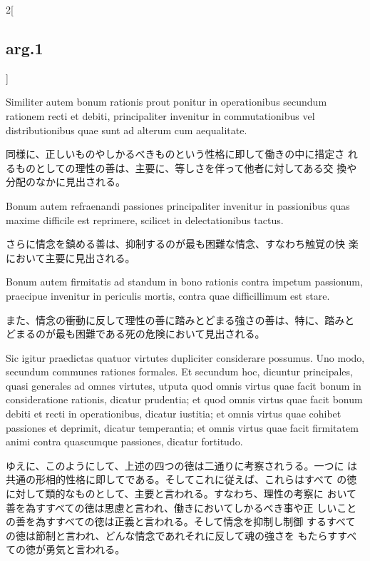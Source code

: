 \documentclass[paper=a4paper,fontsize=10pt,jafontsize=9pt,titlepage]{jlreq}
\begin{document}
\begin{paracol}{2}[\subsection{arg.1}]
\switchcolumn*

Similiter autem bonum rationis prout ponitur in operationibus
 secundum rationem recti et debiti, principaliter invenitur in
 commutationibus vel distributionibus quae sunt ad alterum cum
 aequalitate.

\switchcolumn

同様に、正しいものやしかるべきものという性格に即して働きの中に措定さ
 れるものとしての理性の善は、主要に、等しさを伴って他者に対してある交
 換や分配のなかに見出される。

\switchcolumn*

Bonum autem refraenandi passiones principaliter
 invenitur in passionibus quas maxime difficile est reprimere,
 scilicet in delectationibus tactus.

\switchcolumn

さらに情念を鎮める善は、抑制するのが最も困難な情念、すなわち触覚の快
 楽において主要に見出される。

\switchcolumn*

Bonum autem firmitatis ad standum
 in bono rationis contra impetum passionum, praecipue invenitur in
 periculis mortis, contra quae difficillimum est stare.

\switchcolumn

また、情念の衝動に反して理性の善に踏みとどまる強さの善は、特に、踏みと
どまるのが最も困難である死の危険において見出される。

\switchcolumn*

Sic igitur praedictas quatuor virtutes dupliciter considerare
 possumus. Uno modo, secundum communes rationes formales. Et secundum
 hoc, dicuntur principales, quasi generales ad omnes virtutes, utputa
 quod omnis virtus quae facit bonum in consideratione rationis,
 dicatur prudentia; et quod omnis virtus quae facit bonum debiti et
 recti in operationibus, dicatur iustitia; et omnis virtus quae
 cohibet passiones et deprimit, dicatur temperantia; et omnis virtus
 quae facit firmitatem animi contra quascumque passiones, dicatur
 fortitudo.

\switchcolumn

ゆえに、このようにして、上述の四つの徳は二通りに考察されうる。一つに
 は共通の形相的性格に即してである。そしてこれに従えば、これらはすべて
 の徳に対して類的なものとして、主要と言われる。すなわち、理性の考察に
 おいて善を為すすべての徳は思慮と言われ、働きにおいてしかるべき事や正
 しいことの善を為すすべての徳は正義と言われる。そして情念を抑制し制御
 するすべての徳は節制と言われ、どんな情念であれそれに反して魂の強さを
 もたらすすべての徳が勇気と言われる。


\end{paracol}
\end{document}
